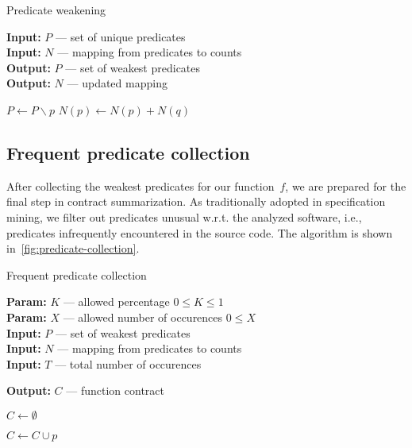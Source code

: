 \begin{algorithm}[tbh]

\caption{Predicate weakening}
\label{fig:predicate-weakening}

\textbf{Input:}  $P$ --- set of unique predicates\\
\textbf{Input:}  $N$ --- mapping from predicates to counts\\
\textbf{Output:} $P$ --- set of weakest predicates\\
\textbf{Output:} $N$ --- updated mapping

\begin{algorithmic}
        \State $P \leftarrow P \backslash p$
        \State $N(p) \leftarrow N(p) + N(q)$
    \EndIf
\EndFor
\end{algorithmic}
\end{algorithm}

\subsection{Frequent predicate collection}\label{sec:predicate-collection}

After collecting the weakest predicates for our function~$f$, we are prepared for the final step in contract summarization. As traditionally adopted in specification mining, we filter out predicates unusual w.r.t. the analyzed software, i.e., predicates infrequently encountered in the source code. The algorithm is shown in~\ref{fig:predicate-collection}.

\begin{algorithm}[tbh]

\caption{Frequent predicate collection}
\label{fig:predicate-collection}

\textbf{Param:} $K$ --- allowed percentage $0 \le K \le 1$\\
\textbf{Param:} $X$ --- allowed number of occurences $0 \le X$\\
\textbf{Input:} $P$ --- set of weakest predicates\\
\textbf{Input:} $N$ --- mapping from predicates to counts\\
\textbf{Input:} $T$ --- total number of occurences

\textbf{Output:} $C$ --- function contract

\begin{algorithmic}

\State $C \leftarrow \emptyset$

    \State \Return
\EndIf

        \State $C \leftarrow C \cup {p}$
    \EndIf
\EndFor
\end{algorithmic}
\end{algorithm}


